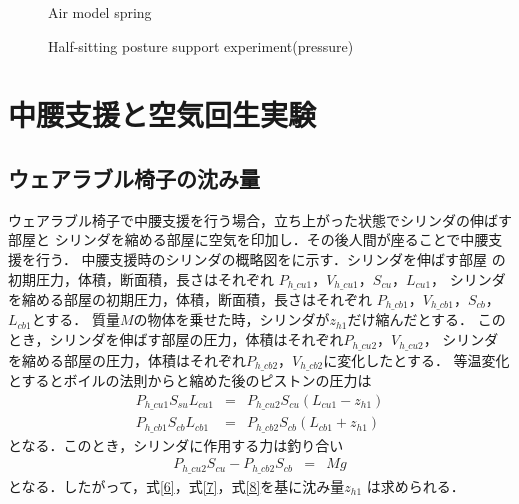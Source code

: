 \begin{figure}[t]%
        \begin{center}%
         \caption{Air model spring}%
         \vspace{-8mm}
        \end{center}%
\end{figure}
\begin{figure}[t]%
        \begin{center}%
         \caption{Half-sitting posture support experiment(pressure)}%
         \vspace{-8mm}
        \end{center}%
\end{figure}
\section{中腰支援と空気回生実験}
\subsection{ウェアラブル椅子の沈み量}
ウェアラブル椅子で中腰支援を行う場合，立ち上がった状態でシリンダの伸ばす部屋と
シリンダを縮める部屋に空気を印加し．その後人間が座ることで中腰支援を行う．
中腰支援時のシリンダの概略図をに示す．シリンダを伸ばす部屋
の初期圧力，体積，断面積，長さはそれぞれ
$P_{h\_cu1}$，$V_{h\_cu1}$，$S_{cu}$，$L_{cu1}$，
シリンダを縮める部屋の初期圧力，体積，断面積，長さはそれぞれ
$P_{h\_cb1}$，$V_{h\_cb1}$，$S_{cb}$，$L_{cb1}$とする．
質量$M$の物体を乗せた時，シリンダが$z_{h1}$だけ縮んだとする．
このとき，シリンダを伸ばす部屋の圧力，体積はそれぞれ$P_{h\_cu2}$，$V_{h\_cu2}$，
シリンダを縮める部屋の圧力，体積はそれぞれ$P_{h\_cb2}$，$V_{h\_cb2}$に変化したとする．
等温変化とするとボイルの法則からと縮めた後のピストンの圧力は
\begin{eqnarray}
        P_{h\_cu1}S_{su}L_{cu1} &=& P_{h\_cu2}S_{cu}(L_{cu1} - z_{h1}) \label{6} \\
        P_{h\_cb1}S_{cb}L_{cb1} &=& P_{h\_cb2}S_{cb}(L_{cb1} + z_{h1}) \label{7}
\end{eqnarray}
となる．このとき，シリンダに作用する力は釣り合い
\begin{eqnarray}
       P_{h\_cu2}S_{cu} - P_{h\_cb2}S_{cb}  &=& Mg\label{8}
\end{eqnarray}
となる．したがって，式\eqref{6}，式\eqref{7}，式\eqref{8}を基に沈み量$z_{h1}$
は求められる．
